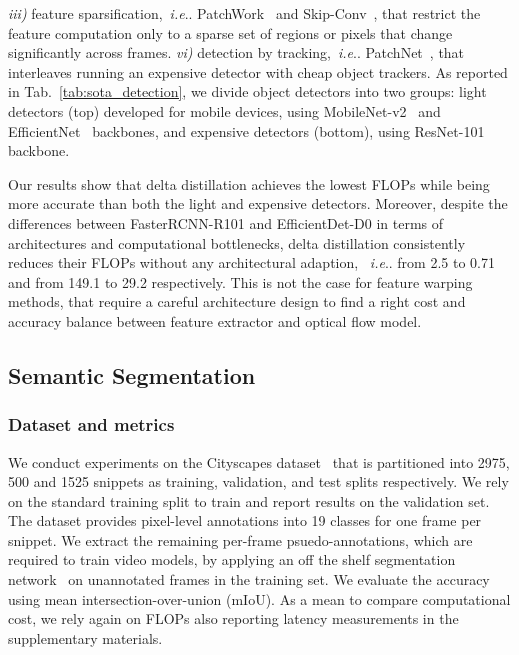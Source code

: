 \documentclass[runningheads]{llncs}
\makeatletter
\DeclareRobustCommand\onedot{\futurelet\@let@token\@onedot}
\def\@onedot{\ifx\@let@token.\else.\null\fi\xspace}
\def\ie{\emph{i.e}\onedot} \def\Ie{\emph{I.e}\onedot}
\makeatother
\begin{document}
\renewcommand{\arraystretch}{1.} \emph{iii)} feature sparsification,~\ie PatchWork~\cite{patchwork} and Skip-Conv~\cite{skipconv}, that restrict the feature computation only to a sparse set of regions or pixels that change significantly across frames. \emph{vi)} detection by tracking,~\ie PatchNet~\cite{patchnet}, that interleaves running an expensive detector with cheap object trackers.
As reported in Tab.~\ref{tab:sota_detection}, we divide object detectors into two groups: light detectors (top) developed for mobile devices, using MobileNet-v2~\cite{mobilenetv2} and EfficientNet~\cite{tan2019efficientnet} backbones, and expensive detectors (bottom), using ResNet-101 backbone.

Our results show that delta distillation achieves the lowest FLOPs while being more accurate than both the light and expensive detectors.
Moreover, despite the differences between FasterRCNN-R101 and EfficientDet-D0 in terms of architectures and computational bottlenecks, delta distillation consistently reduces their FLOPs without any architectural adaption, ~\ie from 2.5 to 0.71 and from 149.1 to 29.2 respectively. This is not the case for feature warping methods, that require a careful architecture design to find a right cost and accuracy balance between feature extractor and optical flow model. \subsection{Semantic Segmentation}
\label{sec:exp_segmentation}
\subsubsection{Dataset and metrics}
We conduct experiments on the Cityscapes dataset~\cite{cityscapes} that is partitioned into 2975, 500 and 1525 snippets as training, validation, and test splits respectively.
We rely on the standard training split to train and report results on the validation set.
The dataset provides pixel-level annotations into 19 classes for one frame per snippet.
We extract the remaining per-frame psuedo-annotations, which are required to train video models, by applying an off the shelf segmentation network~\cite{tao2020hierarchical} on unannotated frames in the training set.
We evaluate the accuracy using mean intersection-over-union (mIoU).
As a mean to compare computational cost, we rely again on FLOPs also reporting latency measurements in the supplementary materials.
\end{document}
